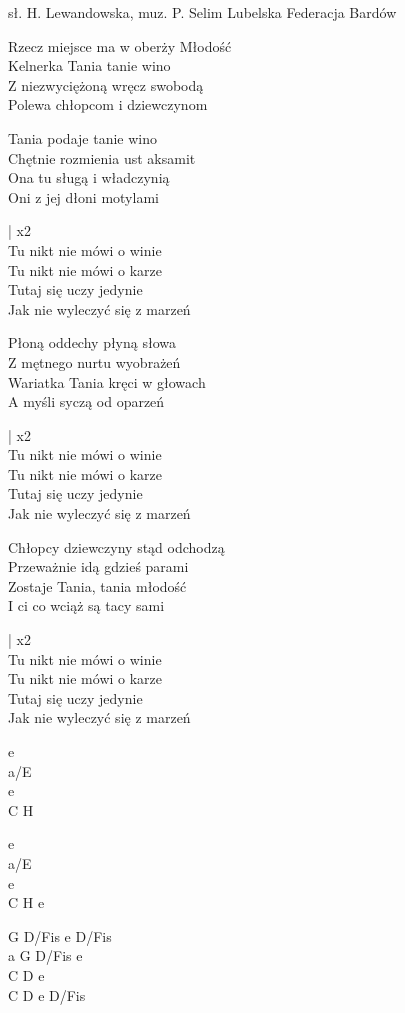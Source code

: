 {sł. H. Lewandowska, muz. P. Selim}
{Lubelska Federacja Bardów}
\begin{text}
Rzecz miejsce ma w oberży Młodość\\
Kelnerka Tania tanie wino\\
Z niezwyciężoną wręcz swobodą\\
Polewa chłopcom i dziewczynom

Tania podaje tanie wino\\
Chętnie rozmienia ust aksamit\\
Ona tu sługą i władczynią\\
Oni z jej dłoni motylami

\vin | x2\\
\vin Tu nikt nie mówi o winie\\
\vin Tu nikt nie mówi o karze\\
\vin Tutaj się uczy jedynie\\
\vin Jak nie wyleczyć się z marzeń

Płoną oddechy płyną słowa\\
Z mętnego nurtu wyobrażeń\\
Wariatka Tania kręci w głowach\\
A myśli syczą od oparzeń

\vin | x2\\
\vin Tu nikt nie mówi o winie\\
\vin Tu nikt nie mówi o karze\\
\vin Tutaj się uczy jedynie\\
\vin Jak nie wyleczyć się z marzeń

Chłopcy dziewczyny stąd odchodzą\\
Przeważnie idą gdzieś parami\\
Zostaje Tania, tania młodość\\
I ci co wciąż są tacy sami

\vin | x2\\
\vin Tu nikt nie mówi o winie\\
\vin Tu nikt nie mówi o karze\\
\vin Tutaj się uczy jedynie\\
\vin Jak nie wyleczyć się z marzeń
\end{text}
\begin{chord}
e\\
a/E\\
e\\
C H

e\\
a/E\\
e\\
C H e

\hfill\break
G D/Fis e D/Fis\\
a G D/Fis e\\
C D e\\
C D e D/Fis
\end{chord}
